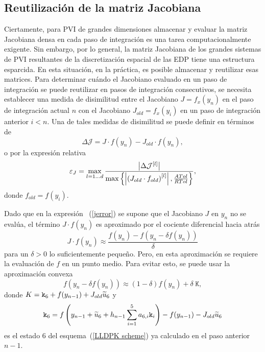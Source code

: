 \subsection{Reutilización de la matriz Jacobiana}\label{secc:jaccontrol}
Ciertamente, para PVI de grandes dimensiones almacenar y evaluar la matriz Jacobiana densa en cada paso de integración es una tarea computacionalmente exigente. Sin embargo, por lo general, la matriz Jacobiana de los grandes sistemas de PVI resultantes de la discretización espacial de las EDP tiene una estructura esparcida. En esta situación, en la práctica, es posible almacenar y reutilizar esas matrices. Para determinar cuándo el Jacobiano evaluado en un paso de integración se puede reutilizar en pasos de integración consecutivos, se necesita establecer una medida de disimilitud entre el Jacobiano $J=f_x(y_n)$ en el paso de integración actual $n$ con el Jacobiano $J_{old}= f_x(y_{i})$ en un paso de integración anterior $i<n$. Una de tales medidas de disimilitud se puede definir en términos de
\begin{equation*}
    \Delta \mathcal{J} = J\cdot f(y_n) - J_{old}\cdot f(y_n),
\end{equation*}
o por la expresión relativa
\begin{equation}\label{jerror}
    \varepsilon_J = \max_{l=1\ldots d}\frac{\left\lvert \Delta \mathcal{J}^{[l]} \right\rvert}
    {\max\left\{ \left\lvert  \left(J_{old}\cdot f_{old}\right)^{[l]}  \right\rvert ,\frac{ATol}{RTol} \right\}},
\end{equation}
donde $f_{old}=f(y_i)$.

Dado que en la expresión ~(\ref{jerror}) se supone que el Jacobiano $J$ en $y_n$ no se evalúa, el término $J\cdot f(y_n)$ es
aproximado por el cociente diferencial hacia atrás
\begin{equation}\label{backapprox}
    J\cdot f(y_n) \approx \frac{f(y_n) -
        f\left(y_n-\delta f(y_n)\right)}{\delta}
\end{equation}
para un $\delta>0$ lo suficientemente pequeño. Pero, en esta aproximación se requiere la evaluación de $f$ en un punto medio. Para evitar esto, se puede usar la aproximación convexa
\begin{equation}\label{aproxaprox}
    f\left(y_n-\delta f(y_n)\right) \approx
    (1-\delta) f(y_n)+ \delta \; \mathtt{K},
\end{equation}
donde $K = \mathtt{k}_{6} + f(y_{n-1}) + J_{old}\widetilde{u}_{6} $ y
\[ \mathtt{k}_6 = f\left( y_{n-1}+\widetilde{u}_6+h_{n-1} \sum_{i=1}^{5}a_{6,i}\mathtt{k}_i \right) - f(y_{n-1}) - J_{old}\widetilde{u}_6 \]
es el estado $6$ del esquema~(\ref{LLDPK scheme}) ya calculado en el paso anterior $n-1$.

